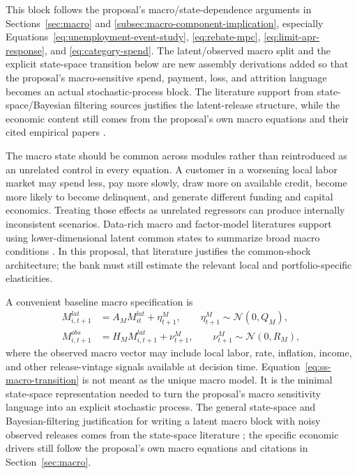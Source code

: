 \documentclass[11pt]{article}
\newcommand{\1}{\mathbf{1}}
\begin{document}
This block follows the proposal's macro/state-dependence arguments in
Sections~\ref{sec:macro} and \ref{subsec:macro-component-implication},
especially Equations~\eqref{eq:unemployment-event-study},
\eqref{eq:rebate-mpc}, \eqref{eq:limit-apr-response}, and
\eqref{eq:category-spend}. The latent/observed macro split and the explicit
state-space transition below are new assembly derivations added so that the
proposal's macro-sensitive spend, payment, loss, and attrition language becomes
an actual stochastic-process block. The literature support from
state-space/Bayesian filtering sources justifies the latent-release structure,
while the economic content still comes from the proposal's own macro equations
and their cited empirical papers
\citep{durbinkoopman2012ssm,westharrison1997bfdm,
ganong2019unemployment,johnson2004rebates,gross2001liquidity,baker2020epidemic}.

The macro state should be common across modules rather than reintroduced as an
unrelated control in every equation. A customer in a worsening local labor
market may spend less, pay more slowly, draw more on available credit, become
more likely to become delinquent, and generate different funding and capital
economics.
Treating those effects as unrelated regressors can produce internally
inconsistent scenarios. Data-rich macro and factor-model literatures support
using lower-dimensional latent common states to summarize broad macro
conditions \citep{bernankeboivin2003datarich,bernankeboivineliasz2005favar,
stockwatson2005factorvar}. In this proposal, that literature justifies the
common-shock architecture; the bank must still estimate the relevant local and
portfolio-specific elasticities.

A convenient baseline macro specification is
\begin{align}
  M^{lat}_{i,t+1}
    &= A_M M^{lat}_{it} + \eta^{M}_{t+1},
       \qquad \eta^{M}_{t+1}\sim\mathcal{N}(0,Q_M),
       \label{eq:ss-macro-transition}\\
  M^{obs}_{i,t+1}
    &= H_M M^{lat}_{i,t+1} + \nu^{M}_{t+1},
       \qquad \nu^{M}_{t+1}\sim\mathcal{N}(0,R_M),
       \label{eq:ss-macro-observation}
\end{align}
where the observed macro vector may include local labor, rate, inflation,
income, and other release-vintage signals available at decision time.
Equation~\eqref{eq:ss-macro-transition} is not meant as the unique macro model.
It is the minimal state-space representation needed to turn the proposal's macro
sensitivity language into an explicit stochastic process. The general state-space
and Bayesian-filtering justification for writing a latent macro block with noisy
observed releases comes from the state-space literature
\citep{durbinkoopman2012ssm,westharrison1997bfdm}; the specific economic drivers
still follow the proposal's own macro equations and citations in
Section~\ref{sec:macro}.
\end{document}

